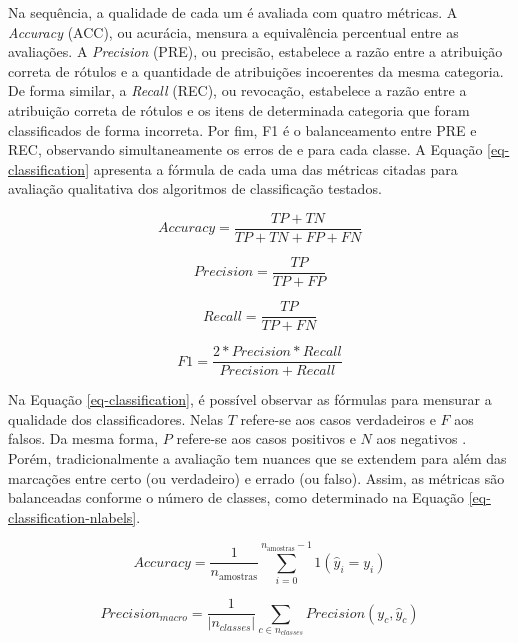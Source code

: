 Na sequência, a qualidade de cada um é avaliada com quatro métricas. A \textit{Accuracy} (ACC), ou acurácia, mensura a equivalência percentual entre as avaliações. A \textit{Precision} (PRE), ou precisão, estabelece a razão entre a atribuição correta de rótulos e a quantidade de atribuições incoerentes da mesma categoria. De forma similar, a \textit{Recall} (REC), ou revocação, estabelece a razão entre a atribuição correta de rótulos e os itens de determinada categoria que foram classificados de forma incorreta. Por fim, F1 é o balanceamento entre PRE e REC, observando simultaneamente os erros de e para cada classe. A Equação \ref{eq-classification} apresenta a fórmula de cada uma das métricas citadas para avaliação qualitativa dos algoritmos de classificação testados.

\begin{equation}
Accuracy = \frac{TP+TN}{TP+TN+FP+FN}
\label{eq-classification}
\end{equation}

\begin{equation*}
Precision = \frac{TP}{TP+FP}
\end{equation*}

\begin{equation*}
Recall = \frac{TP}{TP+FN}
\end{equation*}

\begin{equation*}
F{1} = \frac{2*Precision*Recall}{Precision+Recall}
\end{equation*}

Na Equação \ref{eq-classification}, é possível observar as fórmulas para mensurar a qualidade dos classificadores. Nelas $ T $ refere-se aos casos verdadeiros e $ F $ aos falsos. Da mesma forma, $ P $ refere-se aos casos positivos e $ N $ aos negativos \cite{manning2008}. Porém, tradicionalmente a avaliação tem nuances que se extendem para além das marcações entre certo (ou verdadeiro) e errado (ou falso). Assim, as métricas são balanceadas conforme o número de classes, como determinado na Equação \ref{eq-classification-nlabels}. 

\begin{equation}
Accuracy = \frac{1}{n_\text{amostras}} \sum_{i=0}^{n_\text{amostras}-1} 1(\hat{y}_i = y_i)
\label{eq-classification-nlabels}
\end{equation}

\begin{equation*}
Precision_{macro} = \frac{1}{\left|n_{classes}\right|} \sum_{c \in n_{classes}} Precision(y_c, \hat{y}_c)
\end{equation*}

